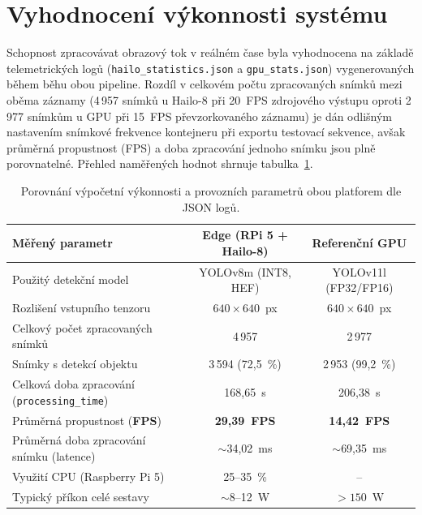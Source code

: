 \documentclass[male,czech,api_bc]{kitheses}
\renewcommand{\arraystretch}{1.23}
\begin{document}
\section{Vyhodnocení výkonnosti systému}
Schopnost zpracovávat obrazový tok v reálném čase byla vyhodnocena na základě telemetrických logů (\texttt{hailo\_statistics.json} a \texttt{gpu\_stats.json}) vygenerovaných během běhu obou pipeline. Rozdíl v celkovém počtu zpracovaných snímků mezi oběma záznamy (4\,957 snímků u Hailo-8 při 20~FPS zdrojového výstupu oproti 2\,977 snímkům u GPU při 15~FPS převzorkovaného záznamu) je dán odlišným nastavením snímkové frekvence kontejneru při exportu testovací sekvence, avšak průměrná propustnost (\acs{FPS}) a doba zpracování jednoho snímku jsou plně porovnatelné. Přehled naměřených hodnot shrnuje tabulka~\ref{tab:performance_eval}.

\begin{table}[H]
    \centering
    \small\renewcommand{\arraystretch}{1.2}
    \setlength{\tabcolsep}{5pt}
    \begin{tabular}{|l|c|c|}
        \hline
        \textbf{Měřený parametr} & \textbf{Edge (RPi 5 + Hailo-8)} & \textbf{Referenční GPU} \\ \hline
        Použitý detekční model & YOLOv8m (INT8, HEF) & YOLOv11l (FP32/FP16) \\ \hline
        Rozlišení vstupního tenzoru & $640 \times 640$~px & $640 \times 640$~px \\ \hline
        Celkový počet zpracovaných snímků & 4\,957 & 2\,977 \\ \hline
        Snímky s detekcí objektu & 3\,594 (72,5~\%) & 2\,953 (99,2~\%) \\ \hline
        Celková doba zpracování (\texttt{processing\_time}) & 168,65~s & 206,38~s \\ \hline
        Průměrná propustnost (\textbf{FPS}) & \textbf{29,39~FPS} & \textbf{14,42~FPS} \\ \hline
        Průměrná doba zpracování snímku (latence) & $\sim$34,02~ms & $\sim$69,35~ms \\ \hline
        Využití CPU (Raspberry Pi 5) & 25--35~\% & -- \\ \hline
        Typický příkon celé sestavy & $\sim$8--12~W & $> 150$~W \\ \hline
    \end{tabular}
    \caption{Porovnání výpočetní výkonnosti a provozních parametrů obou platforem dle JSON logů.}
    \label{tab:performance_eval}
\end{table}
\end{document}
